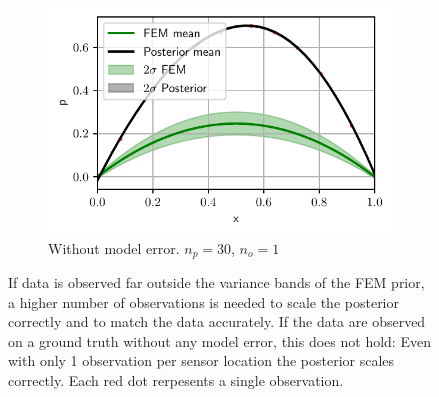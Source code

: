 \documentclass[%
  a4paper,oneside,%
  11pt,%
  smallchapters,
  style=printdev,
  extramargin,
  green,%
  rgb, <cmyk>
  ]{tubsbook}
\begin{document}
\begin{figure}[!ht]
	\begin{subfigure}[t]{.5\textwidth}
	\centering
	\includegraphics[width=1\linewidth]{../../Python/Results/1D/PriorDataConflict/No_Model_Error/Result.pdf}
	\caption{Without model error. $n_p=30$, $n_o=1$}
		\label{fig:1DConflictc}
	\end{subfigure}

\caption[Posterior of the 1D example for observations far outside the FEM prior variance band]{If data is observed far outside the variance bands of the FEM prior, a higher number of observations is needed to scale the posterior correctly and to match the data accurately. If the data are observed on a ground truth without any model error, this does not hold: Even with only 1 observation per sensor location the posterior scales correctly. Each red dot rerpesents a single observation.}
\label{fig:1DConflict}
\end{figure}
%
\FloatBarrier
\end{document}
